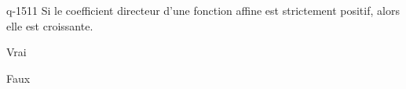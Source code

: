 \begin{truefalse}{q-1511}
Si le coefficient directeur d'une fonction affine est strictement positif, alors elle est croissante.
\item* Vrai
\item Faux
\end{truefalse}

